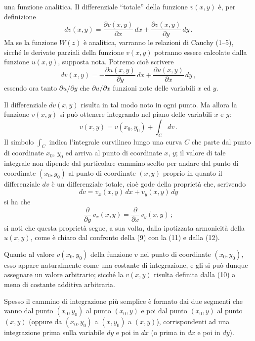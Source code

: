 \documentclass[11pt, a4paper]{book}
\numberwithin{equation}{section}
\begin{document}
una funzione analitica. Il differenziale ``totale'' della funzione $v(x,y)$ è, per definizione
\begin{equation}
dv(x,y) = \frac{\partial v(x,y)}{\partial x}\,dx + \frac{\partial v(x,y)}{\partial y}\,dy\,. \tag{8}
\end{equation}
Ma se la funzione $W(z)$ è analitica, varranno le relazioni di Cauchy (1--5), sicché le derivate parziali della funzione $v(x,y)$ potranno essere calcolate dalla funzione $u(x,y)$, supposta nota. Potremo cioè scrivere
\begin{equation}
dv(x,y) = -\frac{\partial u(x,y)}{\partial y}\,dx + \frac{\partial u(x,y)}{\partial x}\,dy\,, \tag{9}
\end{equation}
essendo ora tanto $\partial u/\partial y$ che $\partial u/\partial x$ funzioni note delle variabili $x$ ed $y$.

Il differenziale $dv(x,y)$ risulta in tal modo noto in ogni punto. Ma allora la funzione $v(x,y)$ si può ottenere integrando nel piano delle variabili $x$ e $y$:
\begin{equation}
v(x,y) = v(x_0, y_0) + \int_C dv\,. \tag{10}
\end{equation}
Il simbolo $\int_C$ indica l'integrale curvilineo lungo una curva $C$ che parte dal punto di coordinate $x_0$, $y_0$ ed arriva al punto di coordinate $x$, $y$; il valore di tale integrale non dipende dal particolare cammino scelto per andare dal punto di coordinate $(x_0, y_0)$ al punto di coordinate $(x, y)$ proprio in quanto il differenziale $dv$ è un differenziale totale, cioè gode della proprietà che, scrivendo
\begin{equation}
dv = v_x(x,y)\,dx + v_y(x,y)\,dy \tag{11}
\end{equation}
si ha che
\begin{equation}
\frac{\partial}{\partial y}\,v_x(x,y) = \frac{\partial}{\partial x}\,v_y(x,y)\,; \tag{12}
\end{equation}
si noti che questa proprietà segue, a sua volta, dalla ipotizzata armonicità della $u(x,y)$, come è chiaro dal confronto della (9) con la (11) e dalla (12).


Quanto al valore $v(x_0, y_0)$ della funzione $v$ nel punto di coordinate $(x_0, y_0)$, esso appare naturalmente come una costante di integrazione, e gli si può dunque assegnare un valore arbitrario; sicché la $v(x,y)$ risulta definita dalla (10) a meno di costante additiva arbitraria.

Spesso il cammino di integrazione più semplice è formato dai due segmenti che vanno dal punto $(x_0, y_0)$ al punto $(x_0, y)$ e poi dal punto $(x_0, y)$ al punto $(x, y)$ (oppure da $(x_0, y_0)$ a $(x, y_0)$ a $(x,y)$), corrispondenti ad una integrazione prima sulla variabile $dy$ e poi in $dx$ (o prima in $dx$ e poi in $dy$).
\end{document}
